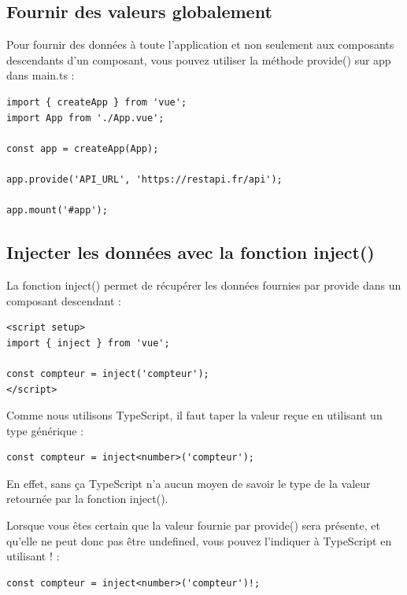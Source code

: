 \subsection{Fournir des valeurs globalement}
Pour fournir des données à toute l'application et non seulement aux composants descendants d'un composant, vous pouvez utiliser la méthode provide() sur app dans main.ts :
\begin{verbatim}
import { createApp } from 'vue';
import App from './App.vue';

const app = createApp(App);

app.provide('API_URL', 'https://restapi.fr/api');

app.mount('#app');
\end{verbatim}
\subsection{Injecter les données avec la fonction {\color{monOrange}inject()}}
La fonction {\color{monOrange}inject()} permet de récupérer les données fournies par {\color{monOrange}provide} dans un composant descendant :
\begin{verbatim}
<script setup>
import { inject } from 'vue';

const compteur = inject('compteur');
</script>
\end{verbatim}
Comme nous utilisons {\color{monOrange}TypeScript}, il faut taper la valeur reçue en utilisant un type générique :
\begin{verbatim}
const compteur = inject<number>('compteur');
\end{verbatim}
En effet, sans ça {\color{monOrange}TypeScript} n'a aucun moyen de savoir le type de la valeur retournée par la fonction {\color{monOrange}inject()}.

Lorsque vous êtes certain que la valeur fournie par {\color{monOrange}provide()} sera présente, et qu'elle ne peut donc pas être undefined, vous pouvez l'indiquer à {\color{monOrange}TypeScript} en utilisant ! :
\begin{verbatim}
const compteur = inject<number>('compteur')!;
\end{verbatim}
